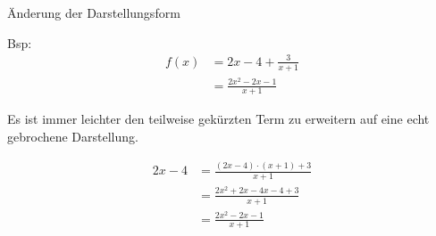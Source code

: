 \documentclass[paper=a6,landscape,ngerman,twoside=true,fontsize=12pt]{scrartcl}
\begin{document}
\begin{frage}
	Änderung der Darstellungsform \bigskip
	
	Bsp: 
	\begin{align*}
	f(x)&=2x -4 +\frac{3}{x+1}\\
	&=\frac{2x^2-2x-1}{x+1}
	\end{align*}
\end{frage}
\begin{antwort}
	\large Es ist immer leichter den teilweise gekürzten Term zu erweitern auf eine echt gebrochene Darstellung.
		
	\begin{align*}
		2x-4&=\frac{(2x-4)\cdot(x+1)+3}{x+1} \\
		&=\frac{2x^2+2x-4x-4+3}{x+1} \\
		&=\frac{2x^2-2x-1}{x+1}
	\end{align*}
\end{antwort}
\end{document}
